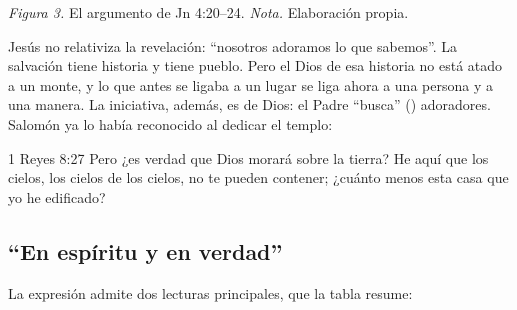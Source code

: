 \begin{center}
\par
{\footnotesize\color{gris}\textit{Figura 3.} El argumento de Jn 4:20--24. \textit{Nota.} Elaboración propia.}
\end{center}

Jesús no relativiza la revelación: ``nosotros adoramos lo que sabemos''. La salvación tiene historia y tiene pueblo. Pero el Dios de esa historia no está atado a un monte, y lo que antes se ligaba a un lugar se liga ahora a una persona y a una manera. La iniciativa, además, es de Dios: el Padre ``busca'' () adoradores. Salomón ya lo había reconocido al dedicar el templo:

\begin{verso}{1 Reyes 8:27}
Pero ¿es verdad que Dios morará sobre la tierra? He aquí que los cielos, los cielos de los cielos, no te pueden contener; ¿cuánto menos esta casa que yo he edificado?
\end{verso}

\subsection{“En espíritu y en verdad”}

La expresión admite dos lecturas principales, que la tabla resume:

